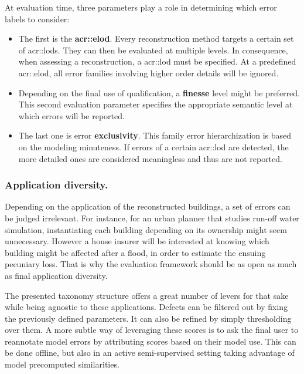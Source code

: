 \documentclass[runningheads]{llncs}
\begin{document}
At evaluation time, three parameters play a role in determining which error labels to consider:
\begin{itemize}
    \item The first is the \textbf{\acrfull{acr::elod}}. Every reconstruction method targets a certain set of \glspl{acr::lod}. They can then be evaluated at multiple levels. In consequence, when assessing a reconstruction, a \acrshort{acr::lod} must be specified. At a predefined \acrshort{acr::elod}, all error families involving higher order details will be ignored.
    \item Depending on the final use of qualification, a \textbf{finesse} level might be preferred. This second evaluation parameter specifies the appropriate semantic level at which errors will be reported.
    \item The last one is error \textbf{exclusivity}. This family error hierarchization is based on the modeling minuteness. If errors of a certain \acrshort{acr::lod} are detected, the more detailed ones are considered meaningless and thus are not reported.
\end{itemize}

\subsubsection{Application diversity.}
Depending on the application of the reconstructed buildings, a set of errors can be judged irrelevant. For instance, for an urban planner that studies run-off water simulation, instantiating each building depending on its ownership might seem unnecessary. However a house insurer will be interested at knowing which building might be affected after a flood, in order to estimate the ensuing pecuniary loss. That is why the evaluation framework should be as open as much as final application diversity.

The presented taxonomy structure offers a great number of levers for that sake while being agnostic to these applications. Defects can be filtered out by fixing the previously defined parameters. It can also be refined by simply thresholding over them. A more subtle way of leveraging these scores is to ask the final user to reannotate model errors by attributing scores based on their model use. This can be done offline, but also in an active semi-supervised setting taking advantage of model precomputed similarities.
\end{document}

